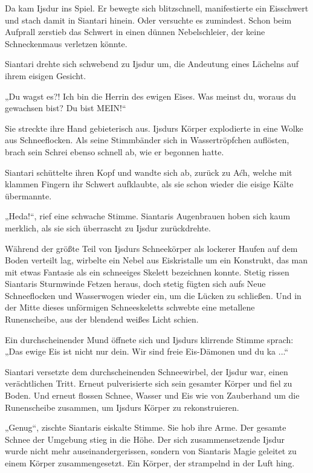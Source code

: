 Da kam Ijsdur ins Spiel. Er bewegte sich blitzschnell, manifestierte ein Eisschwert und stach damit in Siantari hinein. Oder versuchte es zumindest. Schon beim Aufprall zerstieb das Schwert in einen dünnen Nebelschleier, der keine Schneckenmaus verletzen könnte.

Siantari drehte sich schwebend zu Ijsdur um, die Andeutung eines Lächelns auf ihrem eisigen Gesicht.

„Du wagst es?! Ich bin die Herrin des ewigen Eises. Was meinst du, woraus du gewachsen bist? Du bist MEIN!“

Sie streckte ihre Hand gebieterisch aus. Ijsdurs Körper explodierte in eine Wolke aus Schneeflocken. Als seine Stimmbänder sich in Wassertröpfchen auflösten, brach sein Schrei ebenso schnell ab, wie er begonnen hatte.

Siantari schüttelte ihren Kopf und wandte sich ab, zurück zu Aćh, welche mit klammen Fingern ihr Schwert aufklaubte, als sie schon wieder die eisige Kälte übermannte.

„Heda!“, rief eine schwache Stimme. Siantaris Augenbrauen hoben sich kaum merklich, als sie sich überrascht zu Ijsdur zurückdrehte.

Während der größte Teil von Ijsdurs Schneekörper als lockerer Haufen auf dem Boden verteilt lag, wirbelte ein Nebel aus Eiskristalle um ein Konstrukt, das man mit etwas Fantasie als ein schneeiges Skelett bezeichnen konnte. Stetig rissen Siantaris Sturmwinde Fetzen heraus, doch stetig fügten sich aufs Neue Schneeflocken und Wasserwogen wieder ein, um die Lücken zu schließen. Und in der Mitte dieses unförmigen Schneeskeletts schwebte eine metallene Runenscheibe, aus der blendend weißes Licht schien.

Ein durchscheinender Mund öffnete sich und Ijsdurs klirrende Stimme sprach: „Das ewige Eis ist nicht nur dein. Wir sind freie Eis-Dämonen und du ka ...“

Siantari versetzte dem durchscheinenden Schneewirbel, der Ijsdur war, einen verächtlichen Tritt. Erneut pulverisierte sich sein gesamter Körper und fiel zu Boden. Und erneut flossen Schnee, Wasser und Eis wie von Zauberhand um die Runenscheibe zusammen, um Ijsdurs Körper zu rekonstruieren.

„Genug“, zischte Siantaris eiskalte Stimme. Sie hob ihre Arme. Der gesamte Schnee der Umgebung stieg in die Höhe. Der sich zusammensetzende Ijsdur wurde nicht mehr auseinandergerissen, sondern von Siantaris Magie geleitet zu einem Körper zusammengesetzt. Ein Körper, der strampelnd in der Luft hing.

